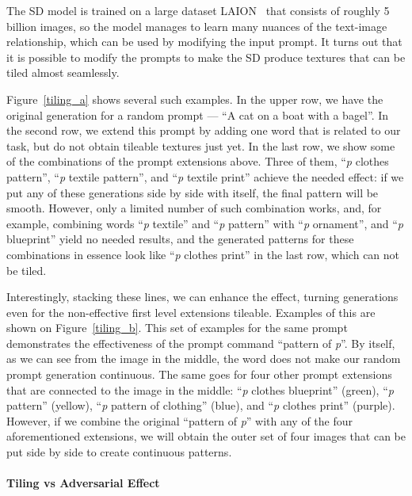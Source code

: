 The SD model is trained on a large dataset LAION~\cite{laion} that consists of roughly 5 billion images, so the model manages to learn many nuances of the text-image relationship, which can be used by modifying the input prompt.
It turns out that it is possible to modify the prompts to make the SD produce textures that can be tiled almost seamlessly.

Figure~\ref{tiling_a} shows several such examples.
In the upper row, we have the original generation for a random prompt --- ``A cat on a boat with a bagel''.
In the second row, we extend this prompt by adding one word that is related to our task, but do not obtain tileable textures just yet. 
In the last row, we show some of the combinations of the prompt extensions above. 
Three of them, ``\textit{p} clothes pattern'', ``\textit{p} textile pattern'', and ``\textit{p} textile print'' achieve the needed effect: if we put any of these generations side by side with itself, the final pattern will be smooth.
However, only a limited number of such combination works, and, for example, combining words ``\textit{p} textile'' and ``\textit{p} pattern'' with ``\textit{p} ornament'', and ``\textit{p} blueprint'' yield no needed results, and the generated patterns for these combinations in essence look like ``\textit{p} clothes print'' in the last row, which can not be tiled.

Interestingly, stacking these lines, we can enhance the effect, turning generations even for the non-effective first level extensions tileable.
Examples of this are shown on Figure~\ref{tiling_b}.
This set of examples for the same prompt demonstrates the effectiveness of the prompt command ``pattern of \textit{p}''.
By itself, as we can see from the image in the middle, the word does not make our random prompt generation continuous.
The same goes for four other prompt extensions that are connected to the image in the middle: ``\textit{p} clothes blueprint'' (green), ``\textit{p} pattern'' (yellow), ``\textit{p} pattern of clothing'' (blue), and ``\textit{p} clothes print'' (purple).
However, if we combine the original ``pattern of \textit{p}'' with any of the four aforementioned extensions, we will obtain the outer set of four images that can be put side by side to create continuous patterns.

\paragraph{Tiling vs Adversarial Effect}

